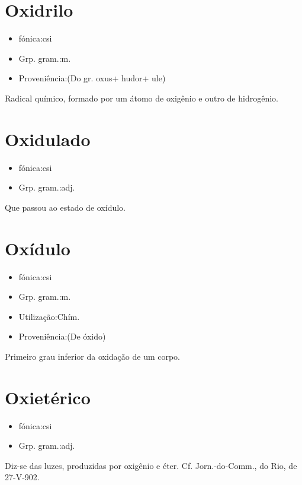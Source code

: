 \section{Oxidrilo}
\begin{itemize}
\item {fónica:csi}
\end{itemize}
\begin{itemize}
\item {Grp. gram.:m.}
\end{itemize}
\begin{itemize}
\item {Proveniência:(Do gr. \textunderscore oxus\textunderscore  + \textunderscore hudor\textunderscore  + \textunderscore ule\textunderscore )}
\end{itemize}
Radical químico, formado por um átomo de oxigênio e outro de hidrogênio.
\section{Oxidulado}
\begin{itemize}
\item {fónica:csi}
\end{itemize}
\begin{itemize}
\item {Grp. gram.:adj.}
\end{itemize}
Que passou ao estado de oxídulo.
\section{Oxídulo}
\begin{itemize}
\item {fónica:csi}
\end{itemize}
\begin{itemize}
\item {Grp. gram.:m.}
\end{itemize}
\begin{itemize}
\item {Utilização:Chím.}
\end{itemize}
\begin{itemize}
\item {Proveniência:(De \textunderscore óxido\textunderscore )}
\end{itemize}
Primeiro grau inferior da oxidação de um corpo.
\section{Oxietérico}
\begin{itemize}
\item {fónica:csi}
\end{itemize}
\begin{itemize}
\item {Grp. gram.:adj.}
\end{itemize}
Diz-se das luzes, produzidas por oxigênio e éter. Cf. \textunderscore Jorn.-do-Comm.\textunderscore , do Rio, de 27-V-902.
